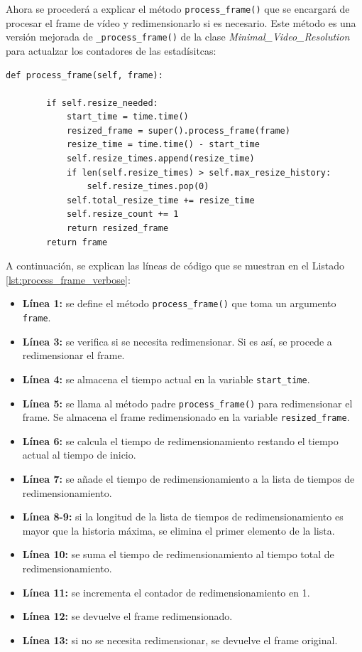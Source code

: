 Ahora se procederá a explicar el método \texttt{process\_frame()} que se encargará de procesar el frame de vídeo y redimensionarlo si es necesario. Este método es una versión mejorada de \texttt{\_process\_frame()} de la clase \textit{Minimal\_Video\_Resolution} para actualzar los contadores de las estadísitcas:
\begin{lstlisting}[style=pythonstyle, caption={Método \texttt{process\_frame()} de \textit{Minimal\_Video\_Resolution\_verbose}.}, label={lst:process_frame_verbose}]
def process_frame(self, frame):
        
        if self.resize_needed:
            start_time = time.time()
            resized_frame = super().process_frame(frame)
            resize_time = time.time() - start_time
            self.resize_times.append(resize_time)
            if len(self.resize_times) > self.max_resize_history:
                self.resize_times.pop(0)
            self.total_resize_time += resize_time
            self.resize_count += 1
            return resized_frame
        return frame
\end{lstlisting}
\vspace{\baselineskip}

A continuación, se explican las líneas de código que se muestran en el Listado \ref{lst:process_frame_verbose}:
\begin{itemize}
    \item \textbf{Línea 1:} se define el método \texttt{process\_frame()} que toma un argumento \texttt{frame}.
    \item \textbf{Línea 3:} se verifica si se necesita redimensionar. Si es así, se procede a redimensionar el frame.
    \item \textbf{Línea 4:} se almacena el tiempo actual en la variable \texttt{start\_time}.
    \item \textbf{Línea 5:} se llama al método padre \texttt{process\_frame()} para redimensionar el frame. Se almacena el frame redimensionado en la variable \texttt{resized\_frame}.
    \item \textbf{Línea 6:} se calcula el tiempo de redimensionamiento restando el tiempo actual al tiempo de inicio.
    \item \textbf{Línea 7:} se añade el tiempo de redimensionamiento a la lista de tiempos de redimensionamiento.
    \item \textbf{Línea 8-9:} si la longitud de la lista de tiempos de redimensionamiento es mayor que la historia máxima, se elimina el primer elemento de la lista.
    \item \textbf{Línea 10:} se suma el tiempo de redimensionamiento al tiempo total de redimensionamiento.
    \item \textbf{Línea 11:} se incrementa el contador de redimensionamiento en 1.
    \item \textbf{Línea 12:} se devuelve el frame redimensionado.
    \item \textbf{Línea 13:} si no se necesita redimensionar, se devuelve el frame original.
\end{itemize}
\vspace{\baselineskip}

